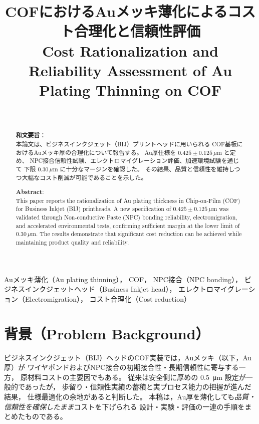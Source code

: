 \documentclass[conference]{IEEEtran}
\title{COFにおけるAuメッキ薄化によるコスト合理化と信頼性評価\\
\large Cost Rationalization and Reliability Assessment of Au Plating Thinning on COF}
\author{%
  \IEEEauthorblockN{三溝 真一（Shinichi Samizo)}\\
  \IEEEauthorblockA{独立系半導体研究者（元セイコーエプソン）\\
  Email: \href{mailto:shin3t72@gmail.com}{shin3t72@gmail.com}\\
  GitHub: \url{https://github.com/Samizo-AITL}}%
}
\begin{document}
\maketitle

\begin{abstract}
\textbf{和文要旨}：\\
本論文は、ビジネスインクジェット（BIJ）プリントヘッドに用いられる
COF基板におけるAuメッキ厚の合理化について報告する。
Au厚仕様を $0.425 \pm 0.125\,\mu$m と定め、
NPC接合信頼性試験、エレクトロマイグレーション評価、加速環境試験を通じて
下限 $0.30\,\mu$m に十分なマージンを確認した。
その結果、品質と信頼性を維持しつつ大幅なコスト削減が可能であることを示した。
\end{abstract}

\begin{abstract}
\textbf{Abstract}:\\
This paper reports the rationalization of Au plating thickness
in Chip-on-Film (COF) for Business Inkjet (BIJ) printheads.
A new specification of $0.425 \pm 0.125\,\mu$m was validated
through Non-conductive Paste (NPC) bonding reliability, electromigration,
and accelerated environmental tests, confirming sufficient margin at the lower limit of $0.30\,\mu$m.
The results demonstrate that significant cost reduction can be achieved
while maintaining product quality and reliability.
\end{abstract}

\begin{IEEEkeywords}
Auメッキ薄化（Au plating thinning），
COF，
NPC接合（NPC bonding），
ビジネスインクジェットヘッド（Business Inkjet head），
エレクトロマイグレーション（Electromigration），
コスト合理化（Cost reduction）
\end{IEEEkeywords}

\section{背景（Problem Background）}
ビジネスインクジェット（BIJ）ヘッドのCOF実装では，Auメッキ（以下，Au厚）が
ワイヤボンドおよびNPC接合の初期接合性・長期信頼性に寄与する一方，
原材料コストの主要因でもある。
従来は安全側に厚めの \SI{0.5}{\micro\meter} 設定が一般的であったが，
歩留り・信頼性実績の蓄積と実プロセス能力の把握が進んだ結果，
仕様最適化の余地があると判断した。
本稿は，Au厚を薄化しても\emph{品質・信頼性を確保したまま}コストを下げられる
設計・実験・評価の一連の手順をまとめたものである。
\end{document}
